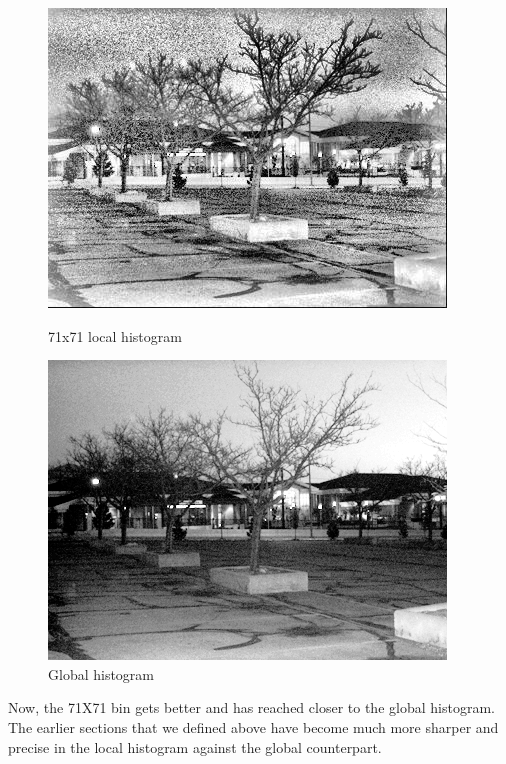 \documentclass{article}
\begin{document}
\begin{figure}[!htb]
    \centering
    \begin{minipage}[b]{0.45\textwidth}
        \includegraphics[width=\textwidth]{LC1_local_71.jpg}
        \caption{71x71 local histogram}
    \end{minipage}
    \begin{minipage}[b]{0.45\textwidth}
        \includegraphics[width=\textwidth]{LC1_global.png}
        \caption{Global histogram}
    \end{minipage}
\end{figure}

Now, the 71X71 bin gets better and has reached closer to the global histogram. The earlier sections that we defined above have become much more sharper and precise in the local histogram against the global counterpart.
\end{document}
